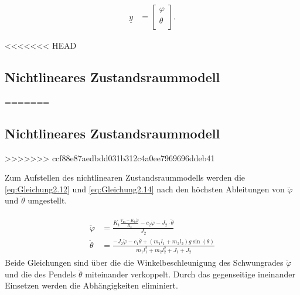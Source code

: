 \begin{align}
    \underline{y} &=
    \begin{bmatrix} \label{eq:Gleichung3.4}
        \varphi     \\
        \theta      \\
    \end{bmatrix}.
\end{align}

<<<<<<< HEAD
\subsection{Nichtlineares Zustandsraummodell} \label{sec:nichtlinearesZustandsraummodell}
=======
\subsection{Nichtlineares Zustandsraummodell}\label{cap:nichtlinearesZustandsraummodell}
>>>>>>> ccf88e87aedbdd031b312c4a0ee7969696ddeb41

Zum Aufstellen des nichtlinearen Zustandsraummodells werden die \autoref{eq:Gleichung2.12} und \autoref{eq:Gleichung2.14} nach den höchsten Ableitungen von $\ddot\varphi$ und $\ddot\theta$ umgestellt.

\begin{align} \label{eq:Gleichung3.5}
    \begin{split}
        \ddot\varphi &= \frac{K_{\mathrm{t}} \frac{V_{\mathrm{m}} - K_{\mathrm{b}} \dot\varphi}{R_{\mathrm{a}}} - c_2 \dot\varphi - J_2 \cdot \ddot\theta}{J_2} \\
        \ddot\theta &= \frac{-J_2 \ddot\varphi - c_1 \dot\theta + \left( m_1 l_1 + m_2 l_2\right) g \sin(\theta)}{m_1 l_1^2 + m_2 l_2^2 + J_1 + J_2}
    \end{split}
\end{align}
\newline
Beide Gleichungen sind über die die Winkelbeschleunigung des Schwungrades $\ddot\varphi$ und die des Pendels $\ddot\theta$ miteinander verkoppelt. Durch das gegenseitige ineinander Einsetzen werden die Abhängigkeiten eliminiert.

